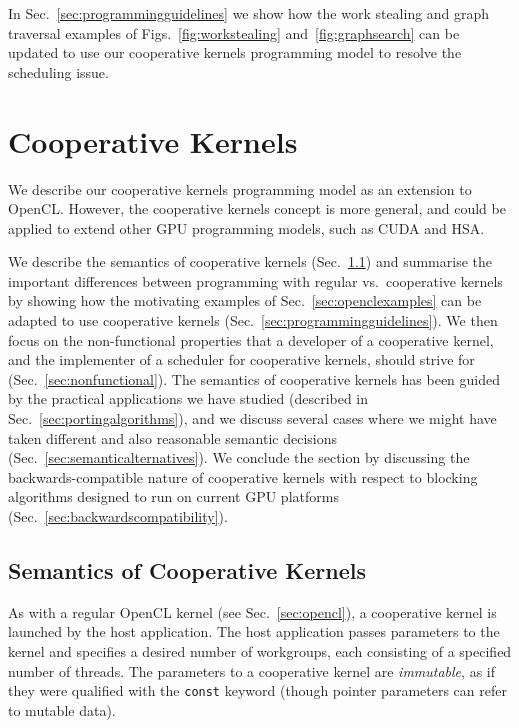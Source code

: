 \documentclass[numbers,nocopyrightspace,10pt]{sigplanconf}
\newcommand{\myfigs}{Figs.~}
\newcommand{\mysec}{Sec.~}
\begin{document}
In \mysec\ref{sec:programmingguidelines} we show how the work stealing
and graph traversal examples of \myfigs\ref{fig:workstealing} and~\ref{fig:graphsearch} can be
updated to use our cooperative kernels programming model to resolve
the scheduling issue.


\section{Cooperative Kernels}\label{sec:cooperativekernels}

We describe our cooperative kernels programming model as an extension
to OpenCL.  However, the cooperative kernels concept is more general,
and could be applied to extend other GPU programming models, such as
CUDA and HSA.

We describe the semantics of cooperative kernels
(\mysec\ref{sec:semantics}) and summarise the important
differences between programming with regular vs.\ cooperative kernels
by showing how the motivating examples of \mysec\ref{sec:openclexamples} can be adapted to use cooperative kernels
(\mysec\ref{sec:programmingguidelines}).
We then focus on the non-functional
properties that a developer of a cooperative kernel, and the
implementer of a scheduler for cooperative kernels, should strive for
(\mysec\ref{sec:nonfunctional}).  The semantics of cooperative
kernels has been guided by the practical applications we have studied
(described in \mysec\ref{sec:portingalgorithms}), and we discuss several cases where we
might have taken different and also reasonable semantic decisions (\mysec\ref{sec:semanticalternatives}).
We conclude the section by discussing the backwards-compatible nature
of cooperative kernels with respect to blocking algorithms designed to
run on current GPU platforms
(\mysec\ref{sec:backwardscompatibility}).

\subsection{Semantics of Cooperative Kernels}\label{sec:semantics}

As with a regular OpenCL kernel (see \mysec\ref{sec:opencl}), a
cooperative kernel is launched by the host application.  The host
application passes parameters to the kernel and specifies a desired
number of workgroups, each consisting of a specified number of
threads.  The parameters to a cooperative kernel are \emph{immutable}, as if
they were qualified with the \texttt{const} keyword (though pointer
parameters can refer to mutable data).
\end{document}
